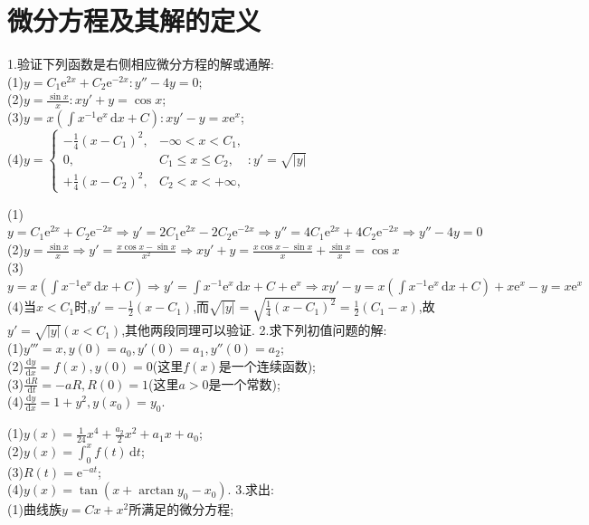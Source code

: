 \documentclass[titlepage,11pt,a4paper,twoside]{report}
\makeatletter
\newcommand\diff{\,\mathrm{d}}
\newcommand\e{\mathrm{e}}
\renewenvironment{proof}{\par
	\pushQED{\qed}%
	\normalfont \topsep1\p@\@plus6\p@\relax
	\trivlist
	\item\relax
	{\hspace*{\parindent}{\heiti 证明}\@addpunct{:}}\hspace\labelsep\ignorespaces
}{%
	\popQED\endtrivlist\@endpefalse
}
\newenvironment{solve}{\par
	\pushQED{\qed}%
	\normalfont \topsep1\p@\@plus6\p@\relax
	\trivlist
	\item\relax
	{\hspace*{\parindent}{\heiti 解}\@addpunct{:}}\hspace\labelsep\ignorespaces
}{%
	\popQED\endtrivlist\@endpefalse
}
\makeatother
\begin{document}
\section{微分方程及其解的定义}
1.验证下列函数是右侧相应微分方程的解或通解:\\
(1)$y=C_1\e^{2x}+C_2\e^{-2x}:y''-4y=0$;\\
(2)$\displaystyle y=\frac{\sin x}{x}:xy'+y=\cos x$;\\
(3)$y=x\left(\int x^{-1}\e^x\diff x+C\right):xy'-y=x\e^x$;\\
(4)$y=\begin{cases}-\frac{1}{4}(x-C_1)^2,&-\infty<x<C_1,\\0,&C_1\leq x\leq C_2,\\+\frac{1}{4}(x-C_2)^2,&C_2<x<+\infty,\end{cases}:y'=\sqrt{|y|}$\\
\begin{proof}(1)$y=C_1\e^{2x}+C_2\e^{-2x}\Rightarrow y'=2C_1\e^{2x}-2C_2\e^{-2x}\Rightarrow y''=4C_1\e^{2x}+4C_2\e^{-2x}\Rightarrow y''-4y=0$\\
(2)$y=\frac{\sin x}{x}\Rightarrow y'=\frac{x\cos x-\sin x}{x^2}\Rightarrow xy'+y=\frac{x\cos x-\sin x}{x}+\frac{\sin x}{x}=\cos x$\\
(3)$y=x\left(\int x^{-1}\e^x\diff x+C\right)\Rightarrow y'=\int x^{-1}\e^x\diff x+C+\e^x\Rightarrow xy'-y=x(\int x^{-1}\e^x\diff x+C)+x\e^x-y=x\e^x$\\
(4)当$x<C_1$时,$y'=-\frac{1}{2}(x-C_1)$,而$\sqrt{|y|}=\sqrt{\frac{1}{4}(x-C_1)^2}=\frac{1}{2}(C_1-x)$,故$y'=\sqrt{|y|}(x<C_1)$,其他两段同理可以验证.
\end{proof}
2.求下列初值问题的解:\\
(1)$y'''=x,y(0)=a_0,y'(0)=a_1,y''(0)=a_2;$\\
(2)$\displaystyle\frac{\diff y}{\diff x}=f(x),y(0)=0$(这里$f(x)$是一个连续函数);\\
(3)$\displaystyle\frac{\diff R}{\diff t}=-aR,R(0)=1$(这里$a>0$是一个常数);\\
(4)$\displaystyle\frac{\diff y}{\diff x}=1+y^2,y(x_0)=y_0.$
\begin{solve}(1)$y(x)=\frac{1}{24}x^4+\frac{a_2}{2}x^2+a_1x+a_0$;\\
(2)$y(x)=\int_0^xf(t)\diff t$;\\
(3)$R(t)=\e^{-at}$;\\
(4)$y(x)=\tan(x+\arctan y_0-x_0)$.
\end{solve}
3.求出:\\
(1)曲线族$y=Cx+x^2$所满足的微分方程;\\
\end{document}
